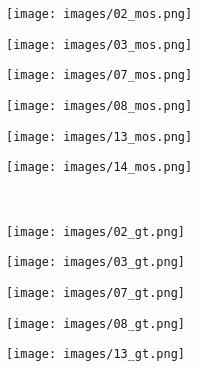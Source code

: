 \documentclass[journal]{IEEEtran}
\begin{document}
\begin{figure*}[!htbp]
    \centering
    \begin{subfigure}[b]{0.16\textwidth}
        \texttt{[image: images/02\_mos.png]}
    \end{subfigure}
    \hfill
    \begin{subfigure}[b]{0.16\textwidth}
        \texttt{[image: images/03\_mos.png]}
    \end{subfigure}
    \hfill
    \begin{subfigure}[b]{0.16\textwidth}
        \texttt{[image: images/07\_mos.png]}
    \end{subfigure}
    \hfill
    \begin{subfigure}[b]{0.16\textwidth}
        \texttt{[image: images/08\_mos.png]}
    \end{subfigure}
    \hfill
    \begin{subfigure}[b]{0.16\textwidth}
        \texttt{[image: images/13\_mos.png]}
    \end{subfigure}
    \hfill
    \begin{subfigure}[b]{0.16\textwidth}
        \texttt{[image: images/14\_mos.png]}
    \end{subfigure}
    \\
    \vspace{1mm}
    \begin{subfigure}[b]{0.16\textwidth}
        \texttt{[image: images/02\_gt.png]}
    \end{subfigure}
    \hfill
    \begin{subfigure}[b]{0.16\textwidth}
        \texttt{[image: images/03\_gt.png]}
    \end{subfigure}
    \hfill
    \begin{subfigure}[b]{0.16\textwidth}
        \texttt{[image: images/07\_gt.png]}
    \end{subfigure}
    \hfill
    \begin{subfigure}[b]{0.16\textwidth}
        \texttt{[image: images/08\_gt.png]}
    \end{subfigure}
    \hfill
    \begin{subfigure}[b]{0.16\textwidth}
        \texttt{[image: images/13\_gt.png]}
    \end{subfigure}
    \hfill
    \begin{subfigure}[b]{0.16\textwidth}

\end{subfigure}
\end{figure*}
\end{document}
